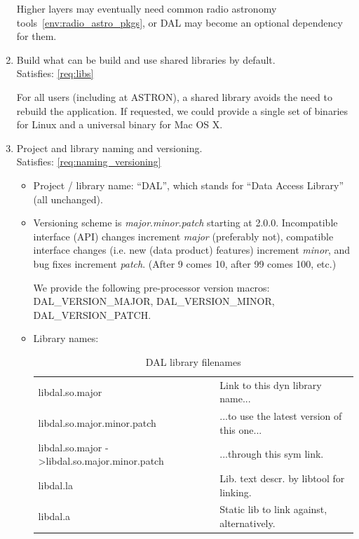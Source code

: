 \documentclass[a4paper,11pt]{article}
\begin{document}
\begin{enumerate}[resume, label=\it D.\arabic{*}]
Higher layers may eventually need common radio astronomy tools~\ref{env:radio_astro_pkgs}, or DAL may become an optional dependency for them.


\item \label{dsg:libs} Build what can be build and use shared libraries by default.\\
Satisfies: \ref{req:libs}

For all users (including at ASTRON), a shared library avoids the need to rebuild the application.
If requested, we could provide a single set of binaries for Linux and a universal binary for Mac OS X.


\item \label{dsg:naming_versioning} Project and library naming and versioning.\\
Satisfies: \ref{req:naming_versioning}\\

\begin{itemize}
\itemsep0em
\item Project / library name: ``DAL'', which stands for ``Data Access Library'' (all unchanged).
\item Versioning scheme is \textit{major}.\textit{minor}.\textit{patch} starting at 2.0.0.
Incompatible interface (API) changes increment \textit{major} (preferably not), compatible interface changes (i.e. new (data product) features) increment \textit{minor}, and bug fixes increment \textit{patch}. (After 9 comes 10, after 99 comes 100, etc.)

We provide the following pre-processor version macros: DAL\_VERSION\_MAJOR, DAL\_VERSION\_MINOR, DAL\_VERSION\_PATCH.
\item Library names:

\begin{table}[htb!]
\label{tab:lib_names}
\centering
\begin{tabular}{ll}
libdal.so.major					& Link to this dyn library name...\\
libdal.so.major.minor.patch			& ...to use the latest version of this one...\\
libdal.so.major -\textgreater libdal.so.major.minor.patch	& ...through this sym link.\\
libdal.la					& Lib. text descr. by libtool for linking.\\
libdal.a					& Static lib to link against, alternatively.\\
\end{tabular}
\caption{DAL library filenames}
\end{table}

\end{itemize}

\end{enumerate}
\end{document}
